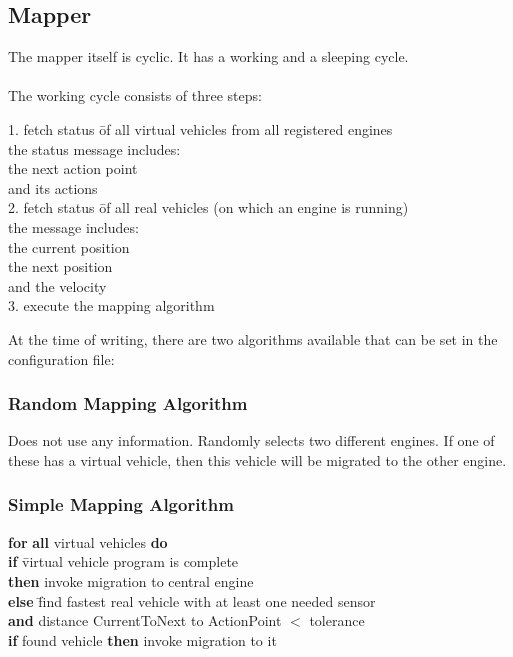 \subsection{Mapper}
The mapper itself is cyclic. It has a working and a sleeping cycle. \\
\\
The working cycle consists of three steps:
\begin{tabbing}
1. fetch status \= of all virtual vehicles from all registered engines \\
\>	the status message includes: \= \\ 
\> \>					the next action point \\ 
\> \>					and its actions \\[0.25cm]
2. fetch status \= of all real vehicles (on which an engine is running) \\
\>	the message includes:  \\
\> \>				the current position \\
\> \> 				the next position \\
\> \>				and the velocity \\[0.25cm]
3. execute the mapping algorithm \\
\end{tabbing}
At the time of writing, there are two algorithms available that can be set in the configuration file:
\subsubsection{Random Mapping Algorithm}
Does not use any information. Randomly selects two different engines. If one of these has a virtual vehicle, then this vehicle 
will be migrated to the other engine.

\subsubsection{Simple Mapping Algorithm}

	\begin{tabbing}
	\textbf{for} \= \textbf{all} virtual vehicles \textbf{do} \\[.25cm]
	\> \textbf{if}  \= virtual vehicle program is complete \\
	\> \>	\textbf{then} invoke migration to central engine \\[.25cm]
	\>	\textbf{else} \= find fastest real vehicle with at least one needed sensor \\
	\> \>	\textbf{and} distance CurrentToNext to ActionPoint \begin{math}< \end{math} tolerance \\[.25cm]
	\>	\textbf{if} found vehicle \textbf{then} invoke migration to it \\
	\end{tabbing}

